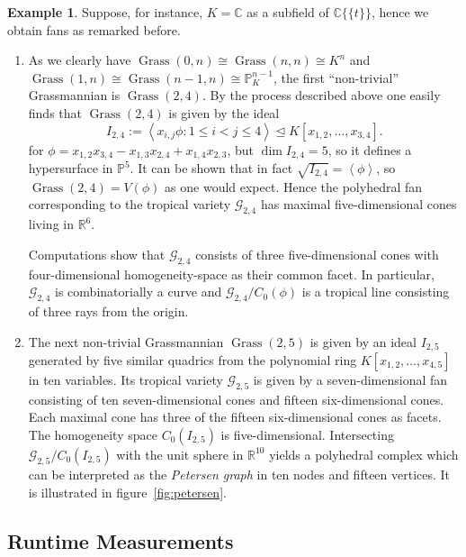 \documentclass[
  paper=a4,
  titlepage,
  bibliography=totoc,
  listof=totoc,
  pagesize=pdftex
]{scrartcl}
\numberwithin{figure}{section}
\numberwithin{equation}{section}
\numberwithin{table}{section}
\newcommand*\setR{\mathds{R}}
\newcommand*\setC{\mathds{C}}
\newcommand*\setP{\mathds{P}}
\newcommand*\ideal[1]{\left\langle #1 \right\rangle}
\newcommand*\puiseux[2]{#1\{\!\{#2\}\!\}}
\newcommand*\CCt{\puiseux{\setC}{t}}
\let\idealof\trianglelefteq
\DeclareMathOperator{\Grass}{Grass}
\theoremstyle{definition}
\newtheorem{example}[definition]{Example}
\numberwithin{definition}{section}
\begin{document}
\begin{example}
  Suppose, for instance, $K = \setC$ as a subfield of $\CCt$, hence we obtain fans as
  remarked before.
  \begin{enumerate}
    \item As we clearly have $\Grass(0,n) \cong \Grass(n,n) \cong K^n$ and $\Grass(1,n)
      \cong \Grass(n-1, n) \cong \setP_K^{n-1}$, the first \enquote{non-trivial}
      Grassmannian is $\Grass(2,4)$. By the process described above one easily finds that
      $\Grass(2,4)$ is given by the ideal
      \[
        I_{2,4} := \ideal{ x_{i,j} \phi : 1 \leq i < j \leq 4 }
        \idealof K[x_{1,2}, \dots, x_{3,4}].
      \]
      for $\phi = x_{1,2}x_{3,4} - x_{1,3}x_{2,4} + x_{1,4}x_{2,3}$, but $\dim I_{2,4} =
      5$, so it defines a hypersurface in $\setP^5$. It can be shown that in fact
      $\sqrt{I_{2,4}} = \ideal \phi$, so $\Grass(2,4) = V(\phi)$ as one would expect.
      Hence the polyhedral fan corresponding to the tropical variety $\mathcal G_{2,4}$
      has maximal five-dimensional cones living in $\setR^6$.

      Computations show that $\mathcal G_{2,4}$ consists of three five-dimensional cones
      with four-dimensional homogeneity-space as their common facet. In particular,
      $\mathcal G_{2,4}$ is combinatorially a curve and $\mathcal G_{2,4}/C_0(\phi)$ is a
      tropical line consisting of three rays from the origin.
    \item The next non-trivial Grassmannian $\Grass(2,5)$ is given by an ideal $I_{2,5}$
      generated by five similar quadrics from the polynomial ring $K[x_{1,2}, \dots,
      x_{4,5}]$ in ten variables. Its tropical variety $\mathcal G_{2,5}$ is given by a
      seven-dimensional fan consisting of ten seven-dimensional cones and fifteen
      six-dimensional cones. Each maximal cone has three of the fifteen six-dimensional
      cones as facets. The homogeneity space $C_0(I_{2,5})$ is five-dimensional.
      Intersecting $\mathcal G_{2,5}/C_0(I_{2,5})$ with the unit sphere in $\setR^{10}$
      yields a polyhedral complex which can be interpreted as the \emph{Petersen graph} in
      ten nodes and fifteen vertices. It is illustrated in figure~\ref{fig:petersen}.
  \end{enumerate}
\end{example}

\subsection{Runtime Measurements}
\end{document}
